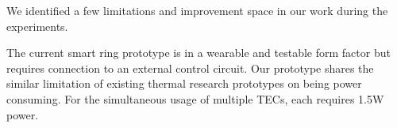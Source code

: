 \documentclass[preprint,12pt]{elsarticle}
\begin{document}



We identified a few limitations and improvement space in our work during the experiments.

The current smart ring prototype is in a wearable and testable form factor but requires connection to an external control circuit. Our prototype shares the similar limitation of existing thermal research prototypes on being power consuming. For the simultaneous usage of multiple TECs, each requires 1.5W power.
\end{document}
